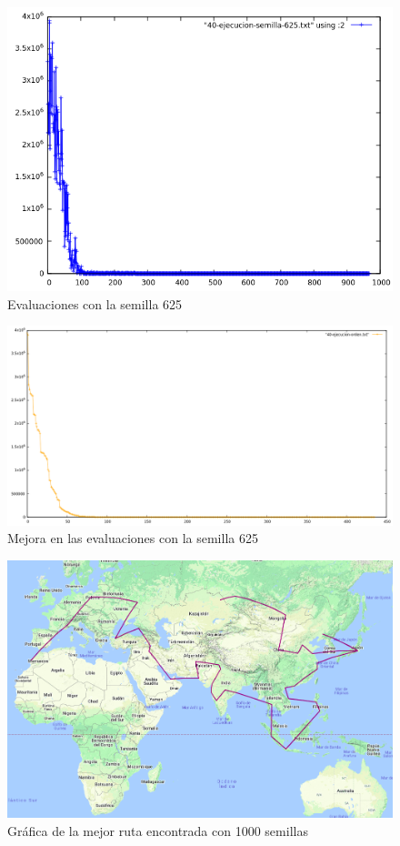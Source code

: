 \documentclass{article}
\begin{document}
\begin{figure}[H]
	\includegraphics[width=\textwidth,height=\textheight,keepaspectratio]{imgs/grafica40.png}
	\caption{Evaluaciones con la semilla 625}
\end{figure}

\begin{figure}[H]
	\includegraphics[width=\textwidth,height=\textheight,keepaspectratio]{imgs/grafica40Mejor.png}
	\caption{Mejora en las evaluaciones con la semilla 625}
\end{figure}

\begin{figure}[H]
	\includegraphics[width=\textwidth,height=\textheight,keepaspectratio]{imgs/mejorruta40.png}
	\caption{Gráfica de la mejor ruta encontrada con 1000 semillas}
\end{figure}
\end{document}
